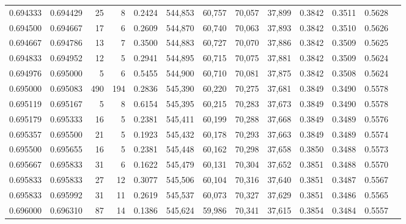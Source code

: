 \begin{tabular}{rrrrrrrrrrrrr}
0.694333 & 0.694429 &    25 &   8 &                                     0.2424 & 544,853 &  60,757 &  70,057 &  37,899 & 0.3842 & 0.3511 & 0.5628 \\
0.694500 & 0.694667 &    17 &   6 &                                     0.2609 & 544,870 &  60,740 &  70,063 &  37,893 & 0.3842 & 0.3510 & 0.5626 \\
0.694667 & 0.694786 &    13 &   7 &                                     0.3500 & 544,883 &  60,727 &  70,070 &  37,886 & 0.3842 & 0.3509 & 0.5625 \\
0.694833 & 0.694952 &    12 &   5 &                                     0.2941 & 544,895 &  60,715 &  70,075 &  37,881 & 0.3842 & 0.3509 & 0.5624 \\
0.694976 & 0.695000 &     5 &   6 &                                     0.5455 & 544,900 &  60,710 &  70,081 &  37,875 & 0.3842 & 0.3508 & 0.5624 \\
0.695000 & 0.695083 &   490 & 194 &                                     0.2836 & 545,390 &  60,220 &  70,275 &  37,681 & 0.3849 & 0.3490 & 0.5578 \\
0.695119 & 0.695167 &     5 &   8 &                                     0.6154 & 545,395 &  60,215 &  70,283 &  37,673 & 0.3849 & 0.3490 & 0.5578 \\
0.695179 & 0.695333 &    16 &   5 &                                     0.2381 & 545,411 &  60,199 &  70,288 &  37,668 & 0.3849 & 0.3489 & 0.5576 \\
0.695357 & 0.695500 &    21 &   5 &                                     0.1923 & 545,432 &  60,178 &  70,293 &  37,663 & 0.3849 & 0.3489 & 0.5574 \\
0.695500 & 0.695655 &    16 &   5 &                                     0.2381 & 545,448 &  60,162 &  70,298 &  37,658 & 0.3850 & 0.3488 & 0.5573 \\
0.695667 & 0.695833 &    31 &   6 &                                     0.1622 & 545,479 &  60,131 &  70,304 &  37,652 & 0.3851 & 0.3488 & 0.5570 \\
0.695833 & 0.695833 &    27 &  12 &                                     0.3077 & 545,506 &  60,104 &  70,316 &  37,640 & 0.3851 & 0.3487 & 0.5567 \\
0.695833 & 0.695992 &    31 &  11 &                                     0.2619 & 545,537 &  60,073 &  70,327 &  37,629 & 0.3851 & 0.3486 & 0.5565 \\
0.696000 & 0.696310 &    87 &  14 &                                     0.1386 & 545,624 &  59,986 &  70,341 &  37,615 & 0.3854 & 0.3484 & 0.5557 \\

\end{tabular}
